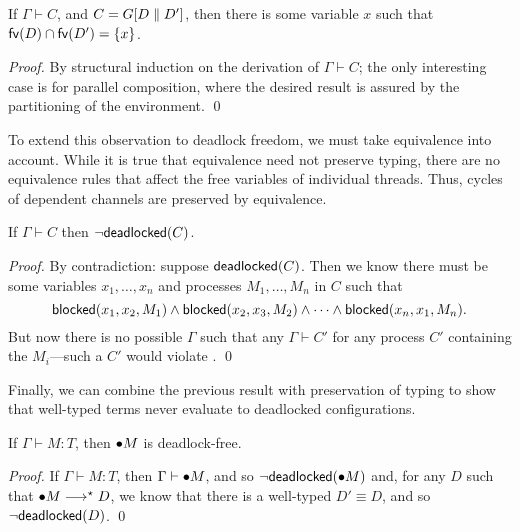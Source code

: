 \documentclass[oribibl,orivec,envcountsame]{llncs}
\begin{document}
\begin{lemma}\label{thm:procs-share-one-channel}
  If $\Gamma \vdash C$, and $C = G[D \parallel D']$, then there is some variable $x$ such that
  $\mathsf{fv}(D) \cap \mathsf{fv}(D') = \{ x \}$.
\end{lemma}

\begin{proof}
  By structural induction on the derivation of $\Gamma \vdash C$; the only interesting case is for
  parallel composition, where the desired result is assured by the partitioning of the
  environment. \qed
\end{proof}

To extend this observation to deadlock freedom, we must take equivalence into account.  While it is
true that equivalence need not preserve typing, there are no equivalence rules that affect the free
variables of individual threads.  Thus, cycles of dependent channels are preserved by equivalence.

\begin{lemma}\label{thm:typed-configs-df}
  If $\Gamma \vdash C$ then $\lnot \mathsf{deadlocked}(C)$.
\end{lemma}

\begin{proof}
  By contradiction: suppose $\mathsf{deadlocked}(C)$.  Then we know there must be some variables
  $x_1,\dots,x_n$ and processes $M_1,\dots,M_n$ in $C$ such that
  \[
    \mathsf{blocked}(x_1,x_2,M_1) \land \mathsf{blocked}(x_2,x_3,M_2) \land \cdots \land \mathsf{blocked}(x_n,x_1,M_n).
  \]
  But now there is no possible $\Gamma$ such that any $\Gamma \vdash C'$ for any process $C'$
  containing the $M_i$---such a $C'$ would violate .  \qed
\end{proof}

Finally, we can combine the previous result with preservation of typing to show that well-typed
terms never evaluate to deadlocked configurations.

\begin{theorem}\label{thm:typed-terms-df}
  If $\Gamma \vdash M: T$, then ${\mathord{\bullet}} M$ is deadlock-free.
\end{theorem}

\begin{proof}
  If $\Gamma \vdash M: T$, then $\Gamma \vdash {\mathord{\bullet}} M$, and so
  $\lnot\mathsf{deadlocked}({\mathord{\bullet}} M)$ and, for any $D$ such that ${\mathord{\bullet}} M \longrightarrow^\star D$, we
  know that there is a well-typed $D' \equiv D$, and so $\lnot\mathsf{deadlocked}(D)$. \qed
\end{proof}
\end{document}
